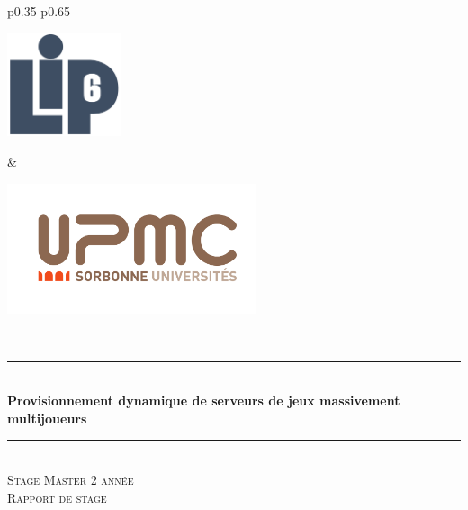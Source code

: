 \documentclass[11pt]{article}
\begin{document}
\begin{titlepage}
	\newcommand{\hsp}{\hspace{20pt}}
	\newcommand{\HRule}{\rule{\linewidth}{0.5mm}}
  \begin{sffamily}
  \begin{center}

		\begin{tabular}{p{0.35\textwidth} p{0.65\textwidth}}
			\begin{center}\vspace{0pt} \includegraphics[width=0.25\textwidth]{logo-lip6.png}\end{center} &
			\begin{center}\vspace{0pt} \includegraphics[width=0.55\textwidth]{logo-upmc.png}\end{center}
		\end{tabular}
		
	
		~\\[2cm]

    

    \HRule \\[0.4cm]
    { \huge \bfseries Provisionnement dynamique de serveurs de jeux massivement multijoueurs\\[0.4cm] }

    \HRule \\[3cm]
		
		\textsc{\LARGE Stage Master 2\ieme{} année}\\[0.5cm]

    \textsc{\Large Rapport de stage}\\[4cm]


\end{center}
\end{sffamily}
\end{titlepage}
\end{document}
